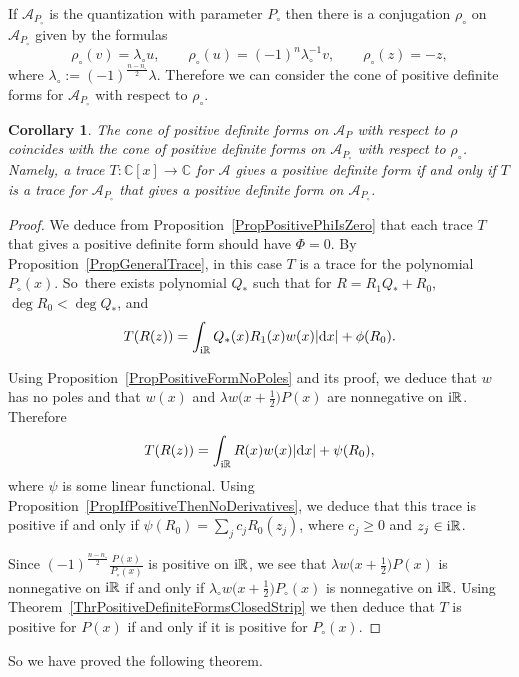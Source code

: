 \documentclass[10pt,a4paper]{amsart}
\newcommand{\RN}{\mathbb{R}} %
\newcommand{\CN}{\mathbb{C}} %
\newcommand{\mc}[1]{\mathcal{#1}}
\newtheorem{Corollary}[Theorem]{Corollary}
\theoremstyle{definition}
\numberwithin{equation}{section}
\begin{document}
If $\mc{A}_{P_\circ}$ is the quantization with parameter $P_\circ$ then there is a conjugation $\rho_\circ$ on $\mc{A}_{P_\circ}$ given by the formulas
\[
\rho_\circ(v)=\lambda_\circ u,\qquad \rho_\circ(u)=(-1)^n \lambda_\circ^{-1}v,\qquad \rho_\circ(z)=-z,
\]
where $\lambda_\circ:=(-1)^{\frac{n-n_\circ}{2}}\lambda$. Therefore we can consider the cone of positive definite forms for $\mc{A}_{P_\circ}$ with respect to $\rho_\circ$.
\begin{Corollary}
The cone of positive definite forms on $\mc{A}_P$ with respect to $\rho$ coincides with the cone of positive definite forms on $\mc{A}_{P_\circ}$ with respect to $\rho_\circ$. Namely, a trace $T\colon \CN[x]\to \CN$ for $\mc{A}$ gives a positive definite form if and only if $T$ is a trace for $\mc{A}_{P_\circ}$ that gives a positive definite form on $\mc{A}_{P_\circ}$.
\end{Corollary}
\begin{proof}
We deduce from Proposition~\ref{PropPositivePhiIsZero} that each trace $T$ that gives a positive definite form should have $\Phi=0$. By Proposition~\ref{PropGeneralTrace}, in this case $T$ is a trace for the polynomial $P_\circ(x)$. So~there exists polynomial $Q_*$ such that for $R=R_1Q_*+R_0$, $\deg R_0<\deg Q_*$, and
\[
T(R(z))=\int_{{\rm i}\RN} Q_*(x)R_1(x)w(x) |{\rm d}x|+\phi(R_0).
\]

Using Proposition~\ref{PropPositiveFormNoPoles} and its proof, we deduce that $w$ has no poles and that $w(x)$ and $\lambda w\big(x+\frac{1}{2}\big)P(x)$ are nonnegative on ${\rm i}\RN$. Therefore
\[
T(R(z))=\int_{{\rm i}\RN} R(x) w(x) |{\rm d}x|+\psi(R_0),
\]
where $\psi$ is some linear functional. Using Proposition~\ref{PropIfPositiveThenNoDerivatives}, we deduce that this trace is positive if and only if $\psi(R_0)=\sum_j c_j R_0(z_j)$, where $c_j\geq 0$ and $z_j\in {\rm i}\mathbb R$.

Since $(-1)^{\frac{n-n_\circ}{2}}\frac{P(x)}{P_\circ(x)}$ is positive on ${\rm i}\RN$, we see that $\lambda w\big(x+\frac{1}{2}\big)P(x)$ is nonnegative on ${\rm i}\RN$ if and only if $\lambda_\circ w\big(x+\frac{1}{2}\big)P_\circ(x)$ is nonnegative on ${\rm i}\RN$. Using Theorem~\ref{ThrPositiveDefiniteFormsClosedStrip} we then deduce that $T$ is positive for $P(x)$ if and only if it is positive for $P_\circ(x)$.
\end{proof}
So we have proved the following theorem.
\end{document}
